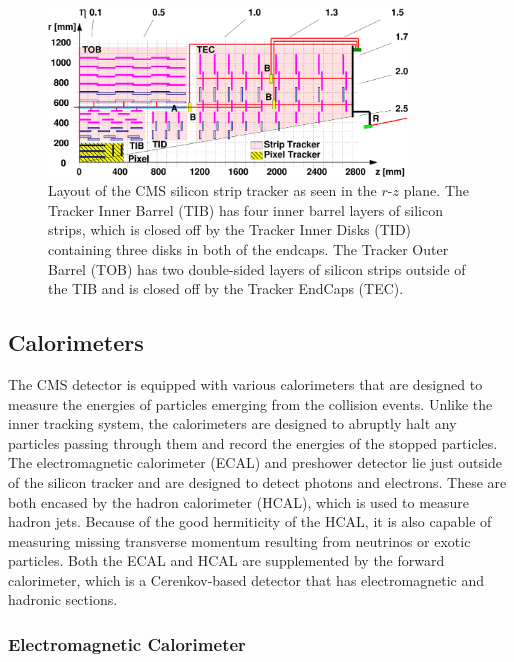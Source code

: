 \begin{figure}[htbp] %
  \centering
  \includegraphics[width=0.85\textwidth]{fig/experiment/cms_siliconTracker.pdf}
  \caption{
    Layout of the CMS silicon strip tracker as seen in the $r$-$z$ plane.
    The Tracker Inner Barrel (TIB) has four inner barrel layers of silicon strips, which is closed off by the Tracker Inner Disks (TID) containing three disks in both of the endcaps.
    The Tracker Outer Barrel (TOB) has two double-sided layers of silicon strips outside of the TIB and is closed off by the Tracker EndCaps (TEC).
  }
  \label{fig:CMSsilicon}
\end{figure}

\subsection{Calorimeters}
\label{subsec:calorimeter}

The CMS detector is equipped with various calorimeters that are designed to measure the energies of particles emerging from the collision events.
Unlike the inner tracking system, the calorimeters are designed to abruptly halt any particles passing through them and record the energies of the stopped particles.
The electromagnetic calorimeter (ECAL) and preshower detector lie just outside of the silicon tracker and are designed to detect photons and electrons.
These are both encased by the hadron calorimeter (HCAL), which is used to measure hadron jets.
Because of the good hermiticity of the HCAL, it is also capable of measuring missing transverse momentum resulting from neutrinos or exotic particles. %
Both the ECAL and HCAL are supplemented by the forward calorimeter, which is a Cerenkov-based detector that has electromagnetic and hadronic sections. %

\subsubsection{Electromagnetic Calorimeter}

